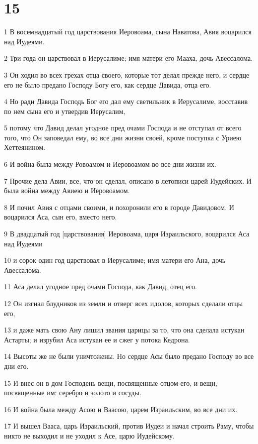\chapter{15}

\par 1 В восемнадцатый год царствования Иеровоама, сына Наватова, Авия воцарился над Иудеями.
\par 2 Три года он царствовал в Иерусалиме; имя матери его Мааха, дочь Авессалома.
\par 3 Он ходил во всех грехах отца своего, которые тот делал прежде него, и сердце его не было предано Господу Богу его, как сердце Давида, отца его.
\par 4 Но ради Давида Господь Бог его дал ему светильник в Иерусалиме, восставив по нем сына его и утвердив Иерусалим,
\par 5 потому что Давид делал угодное пред очами Господа и не отступал от всего того, что Он заповедал ему, во все дни жизни своей, кроме поступка с Уриею Хеттеянином.
\par 6 И война была между Ровоамом и Иеровоамом во все дни жизни их.
\par 7 Прочие дела Авии, все, что он сделал, описано в летописи царей Иудейских. И была война между Авиею и Иеровоамом.
\par 8 И почил Авия с отцами своими, и похоронили его в городе Давидовом. И воцарился Аса, сын его, вместо него.
\par 9 В двадцатый год [царствования] Иеровоама, царя Израильского, воцарился Аса над Иудеями
\par 10 и сорок один год царствовал в Иерусалиме; имя матери его Ана, дочь Авессалома.
\par 11 Аса делал угодное пред очами Господа, как Давид, отец его.
\par 12 Он изгнал блудников из земли и отверг всех идолов, которых сделали отцы его,
\par 13 и даже мать свою Ану лишил звания царицы за то, что она сделала истукан Астарты; и изрубил Аса истукан ее и сжег у потока Кедрона.
\par 14 Высоты же не были уничтожены. Но сердце Асы было предано Господу во все дни его.
\par 15 И внес он в дом Господень вещи, посвященные отцом его, и вещи, посвященные им: серебро и золото и сосуды.
\par 16 И война была между Асою и Ваасою, царем Израильским, во все дни их.
\par 17 И вышел Вааса, царь Израильский, против Иудеи и начал строить Раму, чтобы никто не выходил и не уходил к Асе, царю Иудейскому.
